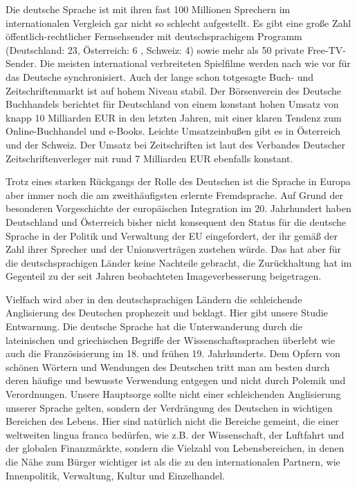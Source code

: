 \begin{multicols}{2}
Die deutsche Sprache ist mit ihren fast 100 Millionen Sprechern im internationalen Vergleich gar nicht so schlecht aufgestellt. 
Es gibt eine große Zahl öffentlich-rechtlicher Fernsehsender mit deutschsprachigem Programm (Deutschland: 23, Österreich:  6 , Schweiz: 4) sowie mehr als 50 private Free-TV-Sender.
Die meisten international verbreiteten Spielfilme werden nach wie vor für das Deutsche synchronisiert. Auch der lange schon totgesagte Buch- und Zeitschriftenmarkt ist auf hohem Niveau stabil. Der Börsenverein des Deutsche Buchhandels berichtet für Deutschland von einem konstant hohen Umsatz von knapp 10 Milliarden EUR in den letzten Jahren, mit einer klaren Tendenz zum Online-Buchhandel und e-Books. Leichte Umsatzeinbußen gibt es in Österreich und der Schweiz.  
Der Umsatz bei Zeitschriften ist laut des Verbandes Deutscher Zeitschriftenverleger mit rund 7 Milliarden EUR ebenfalls konstant. 

Trotz eines starken Rückgangs der Rolle des Deutschen ist die Sprache in Europa aber immer noch die am zweithäufigsten erlernte Fremdsprache.  Auf Grund der besonderen Vorgeschichte der europäischen Integration im 20. Jahrhundert haben Deutschland und Österreich bisher nicht konsequent den Status für die deutsche Sprache in der Politik und Verwaltung der EU eingefordert, der ihr gemäß der Zahl ihrer Sprecher und der Unionsverträgen zustehen würde.  Das hat aber für die deutschsprachigen Länder keine Nachteile gebracht, die Zurückhaltung hat im Gegenteil zu der seit Jahren beobachteten Imageverbesserung beigetragen.

Vielfach wird aber in den deutschsprachigen Ländern die schleichende Anglisierung des Deutschen prophezeit und beklagt. Hier gibt unsere Studie Entwarnung.  Die deutsche Sprache hat die Unterwanderung durch die lateinischen und griechischen Begriffe der Wissenschaftssprachen überlebt wie auch die Französisierung im 18. und frühen 19. Jahrhunderts.  Dem Opfern von schönen Wörtern und Wendungen des Deutschen tritt man am besten durch deren häufige und bewusste Verwendung entgegen und nicht durch Polemik und Verordnungen. Unsere Hauptsorge sollte nicht einer schleichenden Anglisierung unserer Sprache gelten, sondern der Verdrängung des Deutschen in wichtigen Bereichen des Lebens.  Hier sind natürlich nicht die Bereiche gemeint, die einer weltweiten lingua franca bedürfen, wie z.B. der Wissenschaft, der Luftfahrt und der globalen Finanzmärkte, sondern die Vielzahl von Lebensbereichen, in denen die Nähe zum Bürger wichtiger ist als die zu den internationalen Partnern, wie Innenpolitik, Verwaltung, Kultur und Einzelhandel.   


\end{multicols}
